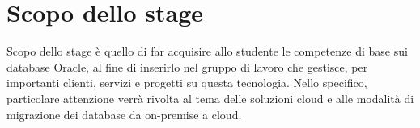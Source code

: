 \section*{Scopo dello stage}
Scopo dello stage è quello di far acquisire allo studente le competenze di base sui database Oracle, al fine di inserirlo nel gruppo di lavoro che gestisce, per importanti clienti, servizi e progetti su questa tecnologia. 
Nello specifico, particolare attenzione verrà rivolta al tema delle soluzioni cloud e alle modalità di migrazione dei database da on-premise a cloud.

